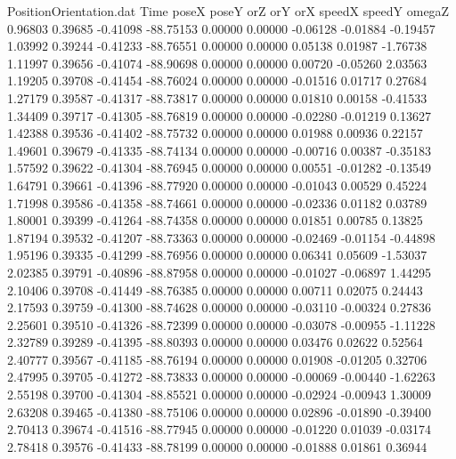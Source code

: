 \begin{filecontents}{PositionOrientation.dat}
Time poseX poseY orZ orY orX speedX speedY omegaZ
   0.96803    0.39685   -0.41098   -88.75153    0.00000    0.00000   -0.06128   -0.01884   -0.19457
   1.03992    0.39244   -0.41233   -88.76551    0.00000    0.00000    0.05138    0.01987   -1.76738
   1.11997    0.39656   -0.41074   -88.90698    0.00000    0.00000    0.00720   -0.05260    2.03563
   1.19205    0.39708   -0.41454   -88.76024    0.00000    0.00000   -0.01516    0.01717    0.27684
   1.27179    0.39587   -0.41317   -88.73817    0.00000    0.00000    0.01810    0.00158   -0.41533
   1.34409    0.39717   -0.41305   -88.76819    0.00000    0.00000   -0.02280   -0.01219    0.13627
   1.42388    0.39536   -0.41402   -88.75732    0.00000    0.00000    0.01988    0.00936    0.22157
   1.49601    0.39679   -0.41335   -88.74134    0.00000    0.00000   -0.00716    0.00387   -0.35183
   1.57592    0.39622   -0.41304   -88.76945    0.00000    0.00000    0.00551   -0.01282   -0.13549
   1.64791    0.39661   -0.41396   -88.77920    0.00000    0.00000   -0.01043    0.00529    0.45224
   1.71998    0.39586   -0.41358   -88.74661    0.00000    0.00000   -0.02336    0.01182    0.03789
   1.80001    0.39399   -0.41264   -88.74358    0.00000    0.00000    0.01851    0.00785    0.13825
   1.87194    0.39532   -0.41207   -88.73363    0.00000    0.00000   -0.02469   -0.01154   -0.44898
   1.95196    0.39335   -0.41299   -88.76956    0.00000    0.00000    0.06341    0.05609   -1.53037
   2.02385    0.39791   -0.40896   -88.87958    0.00000    0.00000   -0.01027   -0.06897    1.44295
   2.10406    0.39708   -0.41449   -88.76385    0.00000    0.00000    0.00711    0.02075    0.24443
   2.17593    0.39759   -0.41300   -88.74628    0.00000    0.00000   -0.03110   -0.00324    0.27836
   2.25601    0.39510   -0.41326   -88.72399    0.00000    0.00000   -0.03078   -0.00955   -1.11228
   2.32789    0.39289   -0.41395   -88.80393    0.00000    0.00000    0.03476    0.02622    0.52564
   2.40777    0.39567   -0.41185   -88.76194    0.00000    0.00000    0.01908   -0.01205    0.32706
   2.47995    0.39705   -0.41272   -88.73833    0.00000    0.00000   -0.00069   -0.00440   -1.62263
   2.55198    0.39700   -0.41304   -88.85521    0.00000    0.00000   -0.02924   -0.00943    1.30009
   2.63208    0.39465   -0.41380   -88.75106    0.00000    0.00000    0.02896   -0.01890   -0.39400
   2.70413    0.39674   -0.41516   -88.77945    0.00000    0.00000   -0.01220    0.01039   -0.03174
   2.78418    0.39576   -0.41433   -88.78199    0.00000    0.00000   -0.01888    0.01861    0.36944

\end{filecontents}
